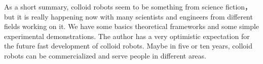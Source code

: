 As a short summary, colloid robots seem to be something from science fiction， but it is really happening now with many scientists and engineers from different fields working on it. We have some basics theoretical frameworks and some simple experimental demonstrations. The author has a very optimistic expectation for the future fast development of colloid robots. Maybe in five or ten years, colloid robots can be commercialized and serve people in different areas.  


